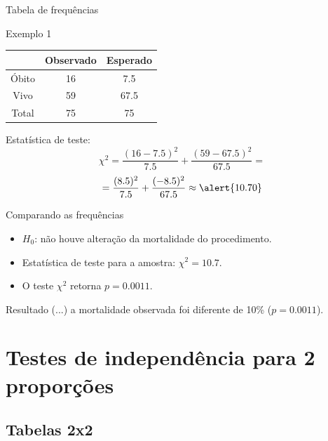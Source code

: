 \documentclass{beamer}
\begin{document}
\begin{frame}{Tabela de frequências}
  \begin{exampleblock}{Exemplo 1}
    \begin{tabular}{c|c|c}
      & Observado & Esperado\\
      \hline
      Óbito & 16 & 7.5 \\
      \hline
      Vivo & 59 & 67.5 \\
      \hline
      Total & 75 & 75\\
    \end{tabular}
  \end{exampleblock}

Estatística de teste:
  \begin{displaymath}
    \chi^2 = \frac{(16 - 7.5)^2}{7.5} + \frac{(59 - 67.5)^2}{67.5} =
  \end{displaymath}
  \begin{displaymath}
    = \frac{(8.5)^2}{7.5} + \frac{(-8.5)^2}{67.5} \approx \alert{10.70}
  \end{displaymath}
\end{frame}

\begin{frame}{Comparando as frequências}
  \begin{itemize}
    \footnotesize
  \item $H_0$: não houve alteração da mortalidade do procedimento.
  \item Estatística de teste para a amostra: $\chi^2 = 10.7$.
  \item O teste $\chi^2$ retorna $p=0.0011$.
  \end{itemize}
  \bigskip
  \begin{block}{Resultado}
    \small
    (...) a mortalidade observada foi diferente de 10\% ($p=0.0011$).
  \end{block}
\end{frame}

\section[2 amostras]{Testes de independência para 2 proporções}

\subsection{Tabelas 2x2}
\end{document}
